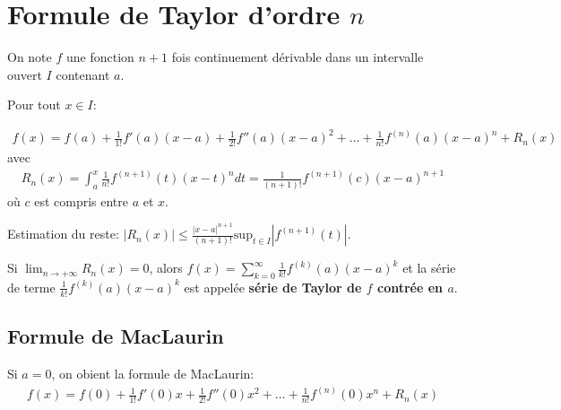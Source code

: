 \section{Formule de Taylor d'ordre $n$}
On note $f$ une fonction $n+1$ fois continuement dérivable dans un intervalle ouvert $I$ contenant $a$.

Pour tout $x\in I$:

\begin{eqnarray}
	f(x)=f(a)+\frac{1}{1!}f'(a)(x-a)+\frac{1}{2!}f''(a)(x-a)^2+\dots+\frac{1}{n!}f^{(n)}(a)(x-a)^n+R_n(x)
\end{eqnarray}
avec \begin{eqnarray}
	R_n(x)=\int_a^x\frac{1}{n!}f^{(n+1)}(t)(x-t)^ndt=\frac{1}{(n+1)!}f^{(n+1)}(c)(x-a)^{n+1}
\end{eqnarray} où $c$ est compris entre $a$ et $x$.

Estimation du reste: $|R_n(x)|\leq\frac{|x-a|^{n+1}}{(n+1)!}\mathrm{sup}_{t\in I}{|f^{(n+1)}(t)|}$.

Si $\lim_{n\rightarrow+\infty}R_n(x)=0$, alors $f(x)=\sum_{k=0}^\infty\frac{1}{k!}f^{(k)}(a)(x-a)^k$ et la série de terme $\frac{1}{k!}f^{(k)}(a)(x-a)^k$ est appelée \textbf{série de Taylor de $f$ contrée en $a$}.
\subsection{Formule de MacLaurin}
Si $a=0$, on obient la formule de MacLaurin:
\begin{eqnarray}
	f(x)=f(0)+\frac{1}{1!}f'(0)x+\frac{1}{2!}f''(0)x^2+\dots+\frac{1}{n!}f^{(n)}(0)x^n+R_n(x)
\end{eqnarray}